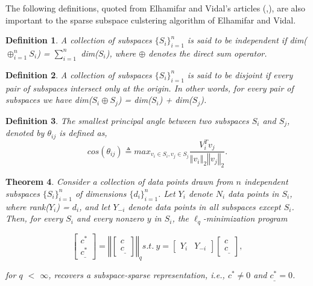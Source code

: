 \documentclass{article}
\newtheorem{theorem}{Theorem}[section]
\newtheorem{definition}[theorem]{Definition}
\begin{document}
\hspace{\parindent}The following definitions, quoted from Elhamifar and Vidal's articles (\cite{elhamifar2012sparse},\cite{SSC-CVPR09-Ehsan}), are also important to the sparse subspace culstering algorithm of Elhamifar and Vidal.

\begin{definition}
A collection of subspaces $\{S_i\}_{i=1}^n$ is said to be independent if dim($\oplus_{i=1}^nS_i$) = $\sum\limits_{i=1}^n$ dim($S_i$), where $\oplus$ denotes the direct sum operator. \cite{elhamifar2012sparse}
\end{definition}

\begin{definition}
A collection of subspaces $\{S_i\}_{i=1}^n$ is said to be disjoint if every pair of subspaces intersect only at the origin. In other words, for every pair of subspaces we have dim($S_i \oplus S_j$) = dim($S_i$) + dim($S_j$). \cite{elhamifar2012sparse}
\end{definition}

\begin{definition}
The smallest principal angle between two subspaces $S_i$ and $S_j$, denoted by $\theta_{ij}$ is defined as,
\[ cos(\theta_{ij}) \triangleq max_{v_i \in S_i, v_j \in S_j} \frac{V_i^T v_j}{\left\Vert v_i \right\Vert_2 \left\Vert v_j \right\Vert_2}.
\]
\cite{elhamifar2012sparse}
\end{definition}

\begin{theorem}
Consider a collection of data points drawn from $n$ independent subspaces $\{S_i\}_{i=1}^n$ of dimensions $\{d_i\}_{i=1}^n$. Let $Y_i$ denote $N_i$ data points in $S_i$, where rank($Y_i$) = $d_i$, and let $Y_{−i}$
denote data points in all subspaces except $S_i$. Then, for every $S_i$ and every nonzero $y$ in $S_i$, the $\ell_q$-minimization program

\[\begin{bmatrix} c^* \\ c^*_\_ \end{bmatrix} =
 \left\Vert \begin{bmatrix} c \\ c_\_ \end{bmatrix} \right\Vert_q s.t. \  y = \begin{bmatrix} Y_i & Y_{-i} \end{bmatrix} \begin{bmatrix} c \\ c_\_ \end{bmatrix},\]

for $q$ $<$ $\infty$, recovers a subspace-sparse representation, i.e., $c^* \neq 0$ and $c^*_{\_} = 0$. \cite{elhamifar2012sparse}
\end{theorem}
\end{document}

